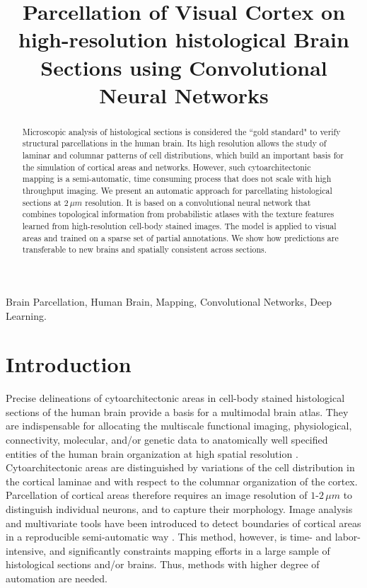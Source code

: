 \documentclass{article}
\title{Parcellation of Visual Cortex on high-resolution histological Brain Sections using Convolutional Neural Networks}
\begin{document}
\maketitle
\begin{abstract}
	Microscopic analysis of histological sections is considered the ``gold standard" to verify structural parcellations in the human brain.
	Its high resolution allows the study of laminar and columnar patterns of cell distributions, which build an important basis for the simulation of cortical areas and networks.
	However, such cytoarchitectonic mapping is a semi-automatic, time consuming process that does not scale with high throughput imaging.
	We present an automatic approach for parcellating histological sections at $2\,\mu m$ resolution.
	It is based on a convolutional neural network that combines topological information from probabilistic atlases with the texture features learned from high-resolution cell-body stained images.
	The model is applied to visual areas and trained on a sparse set of partial annotations. We show how predictions are transferable to new brains and spatially consistent across sections.


\end{abstract}
\begin{keywords}
Brain Parcellation, Human Brain, Mapping, Convolutional Networks, Deep Learning.
\end{keywords}

\section{Introduction}
\label{sec:intro}
Precise delineations of cytoarchitectonic areas in cell-body stained histological sections of the human brain provide a basis for a multimodal brain atlas.
They are indispensable for allocating the multiscale functional imaging, physiological, connectivity, molecular, and/or genetic data to anatomically well specified entities of the human brain organization at high spatial resolution \cite{amunts2015}.
Cytoarchitectonic areas are distinguished by variations of the cell distribution in the cortical laminae and with respect to the columnar organization of the cortex.
Parcellation of cortical areas therefore requires an image resolution of $1$-$2\,\mu m$ to distinguish individual neurons, and to capture their morphology.
Image analysis and multivariate tools have been introduced to detect boundaries of cortical areas in a reproducible semi-automatic way \cite{schleicher1999}.
This method, however, is time- and labor-intensive, and significantly constraints mapping efforts in a large sample of histological sections and/or brains.
Thus, methods with higher degree of automation are needed.
\end{document}
